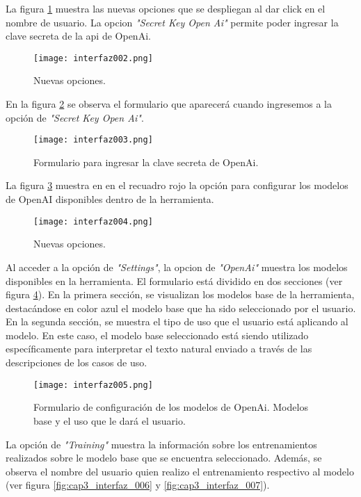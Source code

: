 La figura \ref{fig:cap3_interfaz_002} muestra las nuevas opciones que se despliegan al dar click en el nombre de usuario. La opcion \textit{"Secret Key Open Ai"} permite poder ingresar la clave secreta de la api de OpenAi.

\begin{figure}[H]  
	\centering
	\texttt{[image: interfaz002.png]} 
	\caption{Nuevas opciones.}
	\label{fig:cap3_interfaz_002}
\end{figure}

En la figura \ref{fig:cap3_interfaz_003} se observa el formulario que aparecerá cuando ingresemos a la opción de \textit{"Secret Key Open Ai"}.

\begin{figure}[H]  
	\centering
	\texttt{[image: interfaz003.png]} 
	\caption{Formulario para ingresar la clave secreta de OpenAi.}
	\label{fig:cap3_interfaz_003}
\end{figure}

La figura \ref{fig:cap3_interfaz_004} muestra en en el recuadro rojo la opción para configurar los modelos de OpenAI disponibles dentro de la herramienta.
 
\begin{figure}[H]  
	\centering
	\texttt{[image: interfaz004.png]} 
	\caption{Nuevas opciones.}
	\label{fig:cap3_interfaz_004}
\end{figure}

Al acceder a la opción de \textit{"Settings"}, la opcion de \textit{"OpenAi"} muestra los modelos disponibles en la herramienta. El formulario está dividido en dos secciones (ver figura \ref{fig:cap3_interfaz_005}). En la primera sección, se visualizan los modelos base de la herramienta, destacándose en color azul el modelo base que ha sido seleccionado por el usuario. En la segunda sección, se muestra el tipo de uso que el usuario está aplicando al modelo. En este caso, el modelo base seleccionado está siendo utilizado específicamente para interpretar el texto natural enviado a través de las descripciones de los casos de uso.

\begin{figure}[H]  
	\centering
	\texttt{[image: interfaz005.png]} 
	\caption{Formulario de configuración de los modelos de OpenAi. Modelos base y el uso que le dará el usuario.}
	\label{fig:cap3_interfaz_005}
\end{figure}

La opción de \textit{"Training"} muestra la información sobre los entrenamientos realizados sobre le modelo base que se encuentra seleccionado. Además, se observa el nombre del usuario quien realizo el entrenamiento respectivo al modelo (ver figura \ref{fig:cap3_interfaz_006} y \ref{fig:cap3_interfaz_007}).

